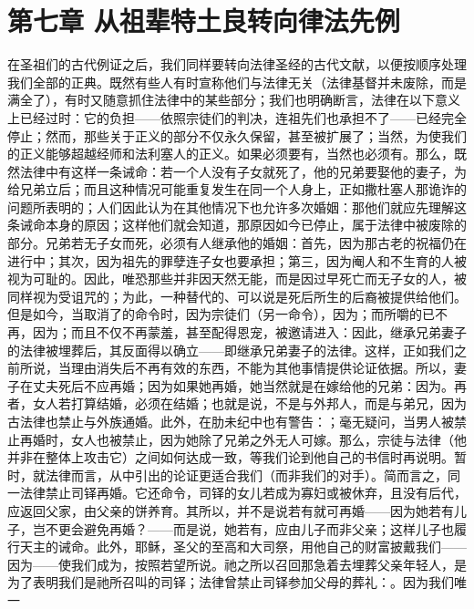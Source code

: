 
\section{第七章 从祖辈特土良转向律法先例}

在圣祖们的古代例证之后，我们同样要转向法律圣经的古代文献，以便按顺序处理我们全部的正典。既然有些人有时宣称他们与法律无关（法律基督并未废除，而是满全了），有时又随意抓住法律中的某些部分；我们也明确断言，法律在以下意义上已经过时：它的负担——依照宗徒们的判决，连祖先们也承担不了——已经完全停止；然而，那些关于正义的部分不仅永久保留，甚至被扩展了；当然，为使我们的正义能够超越经师和法利塞人的正义。如果必须要有，当然也必须有。那么，既然法律中有这样一条诫命：若一个人没有子女就死了，他的兄弟要娶他的妻子，为给兄弟立后；而且这种情况可能重复发生在同一个人身上，正如撒杜塞人那诡诈的问题所表明的；人们因此认为在其他情况下也允许多次婚姻：那他们就应先理解这条诫命本身的原因；这样他们就会知道，那原因如今已停止，属于法律中被废除的部分。兄弟若无子女而死，必须有人继承他的婚姻：首先，因为那古老的祝福仍在进行中；其次，因为祖先的罪孽连子女也要承担；第三，因为阉人和不生育的人被视为可耻的。因此，唯恐那些并非因天然无能，而是因过早死亡而无子女的人，被同样视为受诅咒的；为此，一种替代的、可以说是死后所生的后裔被提供给他们。但是如今，当取消了的命令时，因为宗徒们（另一命令），因为；而所嚼的已不再，因为；而且不仅不再蒙羞，甚至配得恩宠，被邀请进入：因此，继承兄弟妻子的法律被埋葬后，其反面得以确立——即继承兄弟妻子的法律。这样，正如我们之前所说，当理由消失后不再有效的东西，不能为其他事情提供论证依据。所以，妻子在丈夫死后不应再婚；因为如果她再婚，她当然就是在嫁给他的兄弟：因为。再者，女人若打算结婚，必须在结婚；也就是说，不是与外邦人，而是与弟兄，因为古法律也禁止与外族通婚。此外，在肋未纪中也有警告：；毫无疑问，当男人被禁止再婚时，女人也被禁止，因为她除了兄弟之外无人可嫁。那么，宗徒与法律（他并非在整体上攻击它）之间如何达成一致，等我们论到他自己的书信时再说明。暂时，就法律而言，从中引出的论证更适合我们（而非我们的对手）。简而言之，同一法律禁止司铎再婚。它还命令，司铎的女儿若成为寡妇或被休弃，且没有后代，应返回父家，由父亲的饼养育。其所以，并不是说若有就可再婚——因为她若有儿子，岂不更会避免再婚？——而是说，她若有，应由儿子而非父亲；这样儿子也履行天主的诫命。此外，耶稣，圣父的至高和大司祭，用他自己的财富披戴我们——因为——使我们成为，按照若望所说。祂之所以召回那急着去埋葬父亲年轻人，是为了表明我们是祂所召叫的司铎；法律曾禁止司铎参加父母的葬礼：。因为我们唯一